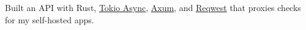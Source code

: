 {Built an API with Rust, \href{https://tokio.rs/tokio/tutorial/async}{Tokio Async}, \href{https://docs.rs/axum/latest/axum/}{Axum}, and \href{https://docs.rs/reqwest/latest/reqwest/}{Reqwest} that proxies checks for my self-hosted apps.}
